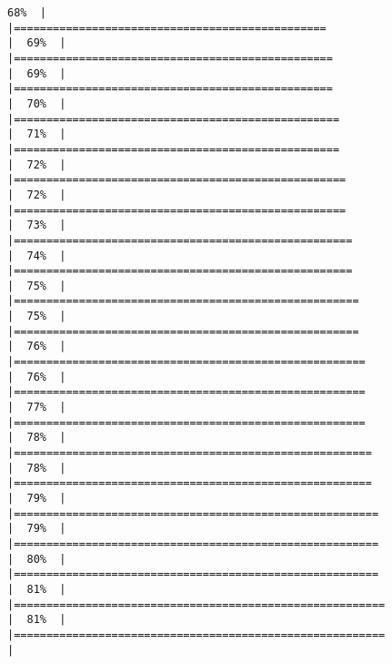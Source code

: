 \documentclass[
]{book}
\begin{document}
\begin{verbatim}
68%  |                                                                              |================================================                      |  69%  |                                                                              |=================================================                     |  69%  |                                                                              |=================================================                     |  70%  |                                                                              |==================================================                    |  71%  |                                                                              |==================================================                    |  72%  |                                                                              |===================================================                   |  72%  |                                                                              |===================================================                   |  73%  |                                                                              |====================================================                  |  74%  |                                                                              |====================================================                  |  75%  |                                                                              |=====================================================                 |  75%  |                                                                              |=====================================================                 |  76%  |                                                                              |======================================================                |  76%  |                                                                              |======================================================                |  77%  |                                                                              |======================================================                |  78%  |                                                                              |=======================================================               |  78%  |                                                                              |=======================================================               |  79%  |                                                                              |========================================================              |  79%  |                                                                              |========================================================              |  80%  |                                                                              |========================================================              |  81%  |                                                                              |=========================================================             |  81%  |                                                                              |=========================================================             |  
\end{verbatim}
\end{document}
